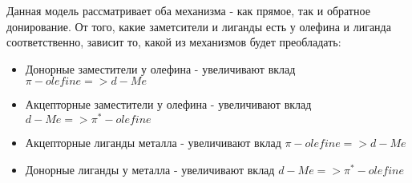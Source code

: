 Данная модель рассматривает оба механизма - как прямое, так и обратное донирование. От того, какие заметсители и лиганды есть у олефина и лиганда соответственно, зависит то, какой из механизмов будет преобладать:

\begin{itemize}
	\item Донорные заместители у олефина - увеличивают вклад $\pi-olefine => d-Me$
	\item Акцепторные заместители у олефина - увеличивают вклад $d-Me => \pi^*-olefine$
	\item Акцепторные лиганды металла - увеличивают вклад $\pi-olefine => d-Me$
	\item Донорные лиганды у металла - увеличивают вклад $d-Me => \pi^*-olefine$
\end{itemize}






